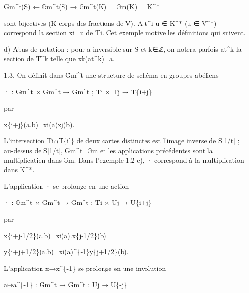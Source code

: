\documentclass[11pt,a4paper]{article}
\begin{document}
Ḡ\textunderscore{}m\textasciicircum{}t(S) ← \ensuremath{\mathbb{G}}\textunderscore{}m\textasciicircum{}t(S) → \ensuremath{\mathbb{G}}\textunderscore{}m\textasciicircum{}t(K) = \ensuremath{\mathbb{G}}\textunderscore{}m(K) = K\textasciicircum{}*

sont bijectives (K corps des fractions de V). A t\textasciicircum{}i u ∈ K\textasciicircum{}* (u ∈ V\textasciicircum{}*) correspond la section x\textunderscore{}i=u de T\textunderscore{}i. Cet exemple motive les définitions qui suivent.

d) Abus de notation : pour a inversible sur S et k∈ℤ, on notera parfois at\textasciicircum{}k la section de T\textasciicircum{}k telle que x\textunderscore{}k(at\textasciicircum{}k)=a.

1.3. On définit dans Ḡ\textunderscore{}m\textasciicircum{}t une structure de schéma en groupes abéliens

· : Ḡ\textunderscore{}m\textasciicircum{}t × Ḡ\textunderscore{}m\textasciicircum{}t → Ḡ\textunderscore{}m\textasciicircum{}t ;     T\textunderscore{}i × T\textunderscore{}j → T\textunderscore{}\{i+j\}

par

x\textunderscore{}\{i+j\}(a.b)=x\textunderscore{}i(a)x\textunderscore{}j(b).

L'intersection T\textunderscore{}i∩T\textunderscore{}\{i'\} de deux cartes distinctes est l'image inverse de S[1/t] ; au-dessus de S[1/t], Ḡ\textunderscore{}m\textasciicircum{}t=\ensuremath{\mathbb{G}}\textunderscore{}m et les applications précédentes sont la multiplication dans \ensuremath{\mathbb{G}}\textunderscore{}m. Dans l'exemple 1.2 c), · correspond à la multiplication dans K\textasciicircum{}*.

L'application · se prolonge en une action

· : \ensuremath{\mathbb{G}}\textunderscore{}m\textasciicircum{}t × Ḡ\textunderscore{}m\textasciicircum{}t → Ḡ\textunderscore{}m\textasciicircum{}t ;     T\textunderscore{}i × U\textunderscore{}j → U\textunderscore{}\{i+j\}

par

x\textunderscore{}\{i+j-1/2\}(a.b)=x\textunderscore{}i(a).x\textunderscore{}\{j-1/2\}(b)

y\textunderscore{}\{i+j+1/2\}(a.b)=x\textunderscore{}i(a)\textasciicircum{}\{-1\}y\textunderscore{}\{j+1/2\}(b).

L'application x→x\textasciicircum{}\{-1\} se prolonge en une involution

a↦a\textasciicircum{}\{-1\} : Ḡ\textunderscore{}m\textasciicircum{}t → Ḡ\textunderscore{}m\textasciicircum{}t :     U\textunderscore{}j → U\textunderscore{}\{-j\}
\end{document}
